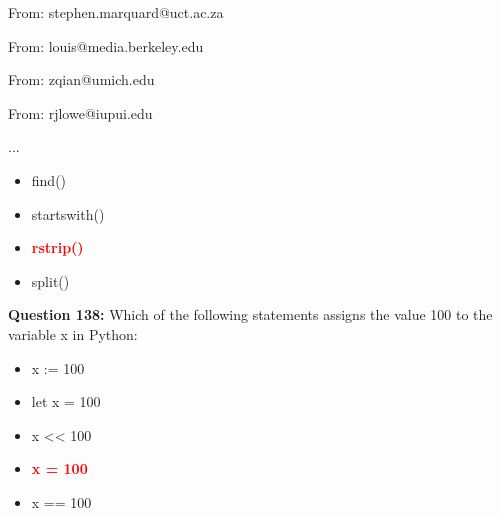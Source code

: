 \documentclass[12pt,a4paper]{article}
\begin{document}
\newline
\newline

\newline
From: stephen.marquard@uct.ac.za\newline

\newline
\newline

\newline
From: louis@media.berkeley.edu\newline

\newline
\newline

\newline
From: zqian@umich.edu\newline

\newline
\newline

\newline
From: rjlowe@iupui.edu\newline

\newline
\newline

\newline
...

\begin{itemize}
    \item[\textbf{A.}] find()
    \item[\textbf{B.}] startswith()
    \item[\textbf{C.}] \textcolor{red}{\textbf{rstrip()}}
    \item[\textbf{D.}] split()
\end{itemize}

\vspace{0.5cm}

\textbf{Question 138:} Which of the following statements assigns the value 100 to the variable x in Python:

\begin{itemize}
    \item[\textbf{A.}] x := 100
    \item[\textbf{B.}] let x = 100
    \item[\textbf{C.}] x << 100
    \item[\textbf{D.}] \textcolor{red}{\textbf{x = 100}}
    \item[\textbf{E.}] x == 100
\end{itemize}
\end{document}

